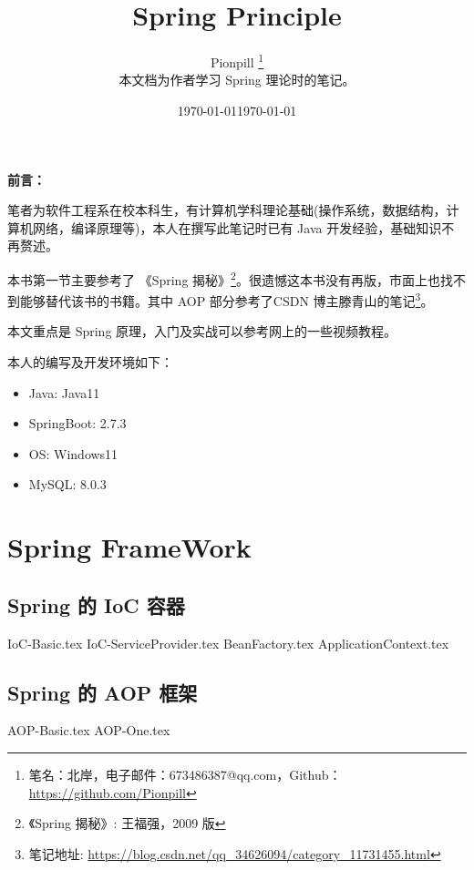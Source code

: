 \documentclass{PionpillNote-book}
\title{Spring Principle}
\author{
    Pionpill \footnote{笔名：北岸，电子邮件：673486387@qq.com，Github：\url{https://github.com/Pionpill}} \\
    本文档为作者学习 Spring 理论时的笔记。\\
}
\date{\today}
\begin{document}
\pagestyle{plain}
\maketitle

\noindent\textbf{前言：}

笔者为软件工程系在校本科生，有计算机学科理论基础(操作系统，数据结构，计算机网络，编译原理等)，本人在撰写此笔记时已有 Java 开发经验，基础知识不再赘述。

本书第一节主要参考了 《Spring 揭秘》\footnote{《Spring 揭秘》: 王福强，2009 版}。很遗憾这本书没有再版，市面上也找不到能够替代该书的书籍。其中 AOP 部分参考了CSDN 博主滕青山的笔记\footnote{笔记地址: \url{https://blog.csdn.net/qq_34626094/category_11731455.html}}。

本文重点是 Spring 原理，入门及实战可以参考网上的一些视频教程。

本人的编写及开发环境如下：
\begin{itemize}
    \item Java: Java11
    \item SpringBoot: 2.7.3
    \item OS: Windows11 
    \item MySQL: 8.0.3
\end{itemize}

\date{\today}
\newpage

\tableofcontents

\newpage

\setcounter{page}{1} 
\pagestyle{fancy}

\part{Spring FrameWork}
\chapter{Spring 的 IoC 容器}
{IoC-Basic.tex}
{IoC-ServiceProvider.tex}
{BeanFactory.tex}
{ApplicationContext.tex}
\chapter{Spring 的 AOP 框架}
{AOP-Basic.tex}
{AOP-One.tex}
\end{document}
